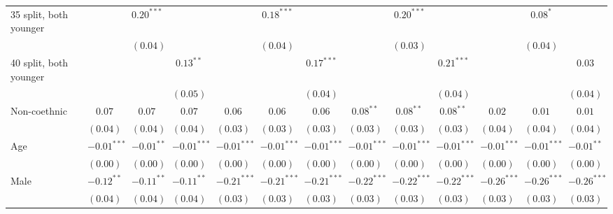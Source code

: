 \begin{table}
\begin{center}
\begin{threeparttable}
\begin{tabular}{l c c c c c c c c c c c c}
35 split, both younger          &               & $0.20^{***}$  &               &               & $0.18^{***}$  &               &               & $0.20^{***}$  &               &               & $0.08^{*}$    &               \\
                                &               & $(0.04)$      &               &               & $(0.04)$      &               &               & $(0.03)$      &               &               & $(0.04)$      &               \\
40 split, both younger          &               &               & $0.13^{**}$   &               &               & $0.17^{***}$  &               &               & $0.21^{***}$  &               &               & $0.03$        \\
                                &               &               & $(0.05)$      &               &               & $(0.04)$      &               &               & $(0.04)$      &               &               & $(0.04)$      \\
Non-coethnic                    & $0.07$        & $0.07$        & $0.07$        & $0.06$        & $0.06$        & $0.06$        & $0.08^{**}$   & $0.08^{**}$   & $0.08^{**}$   & $0.02$        & $0.01$        & $0.01$        \\
                                & $(0.04)$      & $(0.04)$      & $(0.04)$      & $(0.03)$      & $(0.03)$      & $(0.03)$      & $(0.03)$      & $(0.03)$      & $(0.03)$      & $(0.04)$      & $(0.04)$      & $(0.04)$      \\
Age                             & $-0.01^{***}$ & $-0.01^{**}$  & $-0.01^{***}$ & $-0.01^{***}$ & $-0.01^{***}$ & $-0.01^{***}$ & $-0.01^{***}$ & $-0.01^{***}$ & $-0.01^{***}$ & $-0.01^{***}$ & $-0.01^{***}$ & $-0.01^{**}$  \\
                                & $(0.00)$      & $(0.00)$      & $(0.00)$      & $(0.00)$      & $(0.00)$      & $(0.00)$      & $(0.00)$      & $(0.00)$      & $(0.00)$      & $(0.00)$      & $(0.00)$      & $(0.00)$      \\
Male                            & $-0.12^{**}$  & $-0.11^{**}$  & $-0.11^{**}$  & $-0.21^{***}$ & $-0.21^{***}$ & $-0.21^{***}$ & $-0.22^{***}$ & $-0.22^{***}$ & $-0.22^{***}$ & $-0.26^{***}$ & $-0.26^{***}$ & $-0.26^{***}$ \\
                                & $(0.04)$      & $(0.04)$      & $(0.04)$      & $(0.03)$      & $(0.03)$      & $(0.03)$      & $(0.03)$      & $(0.03)$      & $(0.03)$      & $(0.03)$      & $(0.03)$      & $(0.03)$      \\

\end{tabular}
\end{threeparttable}
\end{center}
\end{table}
